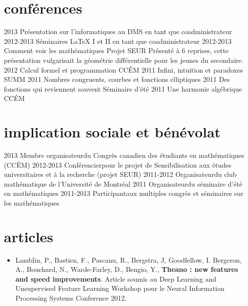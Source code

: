 \documentclass{cv-friggeri}  %
\begin{document}
\section{conférences}


\begin{entrylist}
\entry
{2013}  %
{Présentation sur l'informatiques au DMS}{}
{en tant que coadministrateur}
\entry
{2012-2013}  %
{Séminaires \LaTeX{} I et II}{}
{en tant que coadministrateur}
\entryetc
{2012-2013}
{Comment voir les mathématiques}{}
{Projet SEUR}
{Présenté à 6 reprises, cette présentation vulgarisait la géométrie différentielle pour les jeunes du secondaire.}
\entry
{2012}  %
{Calcul formel et programmation}{}
{CCÉM}
\entry
{2011}  %
{Infini, intuition et paradoxes}{}
{SUMM}
\entry
{2011}  %
{Nombres congruents, courbes et fonctions elliptiques}{}
{}%
\entry
{2011}  %
{Des fonctions qui reviennent souvent}{}
{Séminaire d'été}
\entry
{2011}  %
{Une harmonie algébrique}{}
{CCÉM}
\end{entrylist}


\section{implication sociale et bénévolat}


\begin{entrylist}
\entry
{2013}
{Membre organisateur}{du Congrès canadien des étudiants en mathématiques (CCÉM)}
{}
\entry
{2012-2013}
{Conférencier}{pour le projet de Sensibilisation aux études universitaires et à la recherche (projet SEUR)}
{}
\entry
{2011-2012}
{Organisateur}{du club mathématique de l'Université de Montréal}
{}
\entry
{2011}
{Organisateur}{du séminaire d'été en mathématiques}
{}
\entry
{2011-2013}
{Participant}{aux multiples congrès et séminaires sur les mathématiques}
{}
\end{entrylist}

\section{articles}

\begin{itemize}
  \item Lamblin, P., Bastien, F., Pascanu, R., Bergstra, J, Goodfellow, I. Bergeron, A., Bouchard, N., Warde-Farley, D., Bengio, Y., \textbf{Theano : new features and speed improvements}. Article soumis au Deep Learning and Unsupervised Feature Learning Workshop pour le Neural Information Processing Systems Conference 2012.
\end{itemize}
\end{document}
